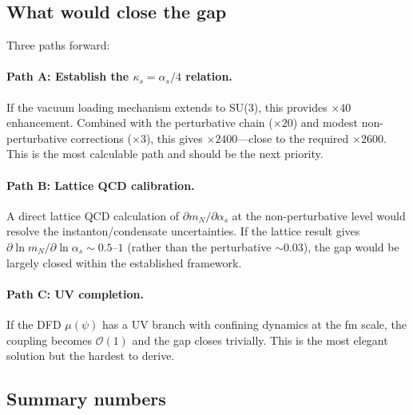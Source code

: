 \documentclass[aps,prd,twocolumn,superscriptaddress,floatfix,nofootinbib]{revtex4-2}
\newcommand{\mufunction}{\mu}
\newcommand{\kap}{\kappa}
\renewcommand{\order}[1]{\mathcal{O}\!\left(#1\right)}
\newcommand{\as}{\alpha_s}
\newcommand{\mN}{m_N}
\begin{document}
\subsection{What would close the gap}

Three paths forward:

\paragraph{Path A: Establish the $\kap_s = \as/4$ relation.}
If the vacuum loading mechanism extends to SU(3), this provides $\times 40$
enhancement. Combined with the perturbative chain ($\times 20$) and modest
non-perturbative corrections ($\times 3$), this gives $\times 2400$---close
to the required $\times 2600$. This is the most calculable path and should
be the next priority.

\paragraph{Path B: Lattice QCD calibration.}
A direct lattice QCD calculation of $\partial \mN/\partial \as$ at the
non-perturbative level would resolve the instanton/condensate uncertainties.
If the lattice result gives $\partial\ln\mN/\partial\ln\as \sim 0.5$--$1$
(rather than the perturbative $\sim 0.03$), the gap would be largely closed
within the established framework.

\paragraph{Path C: UV completion.}
If the DFD $\mufunction(\psi)$ has a UV branch with confining dynamics at
the fm scale, the coupling becomes $\order{1}$ and the gap closes trivially.
This is the most elegant solution but the hardest to derive.

\subsection{Summary numbers}\label{sec:summary_numbers}
\end{document}
